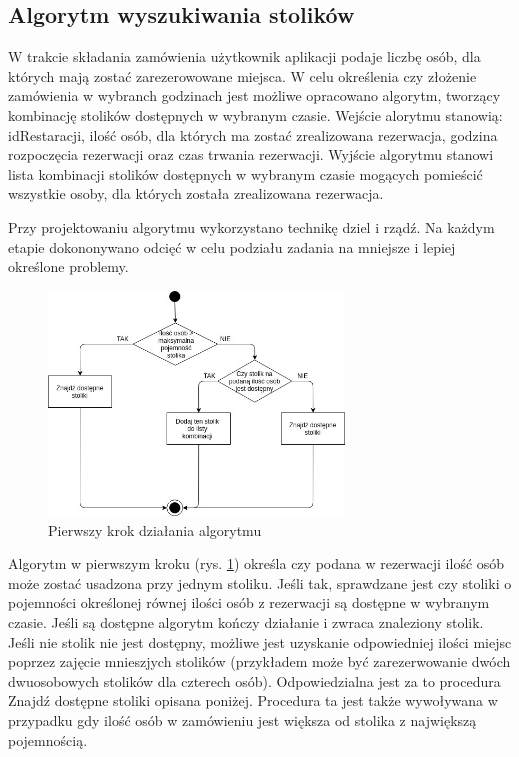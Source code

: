 \documentclass{article}
\begin{document}
\newpage
\subsection{Algorytm wyszukiwania stolików}
W trakcie składania zamówienia użytkownik aplikacji podaje liczbę osób, dla których mają zostać zarezerowowane miejsca. W celu określenia czy złożenie zamówienia w wybranch godzinach jest możliwe opracowano algorytm, tworzący kombinację stolików dostępnych w wybranym czasie. Wejście alorytmu stanowią:
idRestaracji,
ilość osób, dla których ma zostać zrealizowana rezerwacja,
godzina rozpoczęcia rezerwacji oraz
czas trwania rezerwacji.
Wyjście algorytmu stanowi lista kombinacji stolików dostępnych w wybranym czasie mogących pomieścić wszystkie osoby, dla których została zrealizowana rezerwacja. 

Przy projektowaniu algorytmu wykorzystano technikę dziel i rządź. Na każdym etapie dokononywano odcięć w celu podziału zadania na mniejsze i lepiej określone problemy.

\begin{figure}[h]
\centering
	\includegraphics[width=0.70\textwidth]{algo1.jpg}
	\caption[caption]{Pierwszy krok działania algorytmu}
	\label{fig:alg1}
\end{figure}

Algorytm w pierwszym kroku (rys. \ref{fig:alg1}) określa czy podana w rezerwacji ilość osób może zostać usadzona przy jednym stoliku. Jeśli tak, sprawdzane jest czy stoliki o pojemności określonej równej ilości osób z rezerwacji są dostępne w wybranym czasie. Jeśli są dostępne algorytm kończy działanie i zwraca znaleziony stolik. Jeśli nie stolik nie jest dostępny, możliwe jest uzyskanie odpowiedniej ilości miejsc poprzez zajęcie mnieszjych stolików (przykładem może być zarezerwowanie dwóch dwuosobowych stolików dla czterech osób). Odpowiedzialna jest za to procedura Znajdź dostępne stoliki opisana poniżej. Procedura ta jest także wywoływana w przypadku gdy ilość osób w zamówieniu jest większa od stolika z największą pojemnością.
\end{document}
